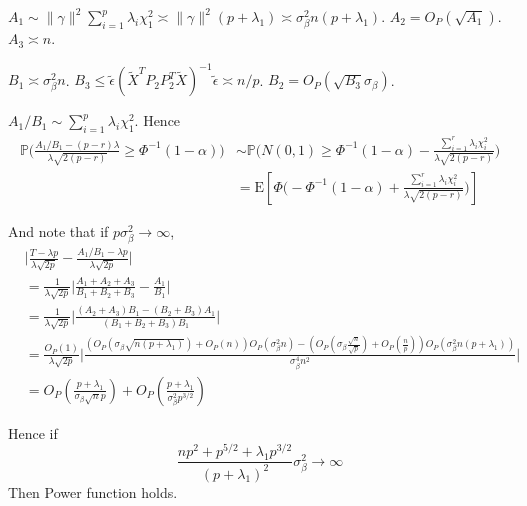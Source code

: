 \documentclass[review]{elsarticle}
\theoremstyle{plain}
\theoremstyle{definition}
\theoremstyle{remark}
\begin{document}
$A_1\sim \|\gamma\|^2\sum_{i=1}^{p}\lambda_i \chi^2_1\asymp \|\gamma\|^2 (p+\lambda_1)\asymp \sigma^2_\beta n(p+\lambda_1)$. $A_2=O_P(\sqrt{A_1})$. $A_3\asymp n$.

$B_1\asymp \sigma^2_\beta n$. $B_3 \leq \tilde{\epsilon}{(\tilde{X}^T P_2 P_2^T\tilde{X})}^{-1}\tilde{\epsilon}\asymp n/p$. $B_2=O_P(\sqrt{B_3}\sigma_\beta)$.


$A_1/B_1\sim \sum_{i=1}^p \lambda_i \chi^2_1$. Hence
\begin{equation}
    \begin{aligned}
    \mathbb{P}\Big(\frac{A_1/B_1-(p-r)\lambda}{\lambda\sqrt{2(p-r)}}\geq \Phi^{-1}(1-\alpha)\Big)
        &\sim\mathbb{P}\Big(N(0,1)\geq \Phi^{-1}(1-\alpha)-\frac{\sum_{i=1}^r \lambda_i \chi^2_i}{\lambda\sqrt{2(p-r)}}\Big)\\
        &=\textrm{E}[\Phi\Big(-\Phi^{-1}(1-\alpha)+\frac{\sum_{i=1}^r \lambda_i \chi^2_i}{\lambda\sqrt{2(p-r)}}\Big)]
    \end{aligned}
\end{equation}

And note that if $p \sigma_{\beta}^2\to \infty$,
\begin{equation}
    \begin{aligned}
        &\Big|\frac{T-{\lambda p}}{\lambda\sqrt{2p}
        }-
    \frac{{A_1}/{B_1}-{\lambda p}}{\lambda\sqrt{2p}
        }\Big|\\
        &=
        \frac{1}{\lambda\sqrt{2p}}
        \Big|
        \frac{A_1+A_2+A_3}{B_1+B_2+B_3}-\frac{A_1}{B_1}
        \Big|\\
        &=
        \frac{1}{\lambda\sqrt{2p}}
        \Big|
        \frac{(A_2+A_3)B_1-(B_2+B_3)A_1}{(B_1+B_2+B_3)B_1}
        \Big|\\
        &=
        \frac{O_{P}(1)}{\lambda\sqrt{2p}}
        \Big|
        \frac{(O_P(\sigma_{\beta}\sqrt{n(p+\lambda_1)})+O_P(n))O_P(\sigma^2_\beta n)-(O_P(\sigma_{\beta}\frac{\sqrt{n}}{\sqrt{p}})+O_P(\frac{n}{p}))O_P(\sigma^2_{\beta} n(p+\lambda_1))}{\sigma^4_{\beta}n^2}
        \Big|\\
        &=O_P(\frac{p+\lambda_1}{\sigma_{\beta}\sqrt{n}p})+O_P(\frac{p+\lambda_1}{\sigma^2_{\beta}p^{3/2}})
    \end{aligned}
\end{equation}

Hence if 
\begin{equation}
    \frac{np^2+p^{5/2}+\lambda_1 p^{3/2}}{{(p+\lambda_1)}^2}\sigma^2_{\beta}\to \infty
\end{equation}
Then Power function holds.
\end{document}
